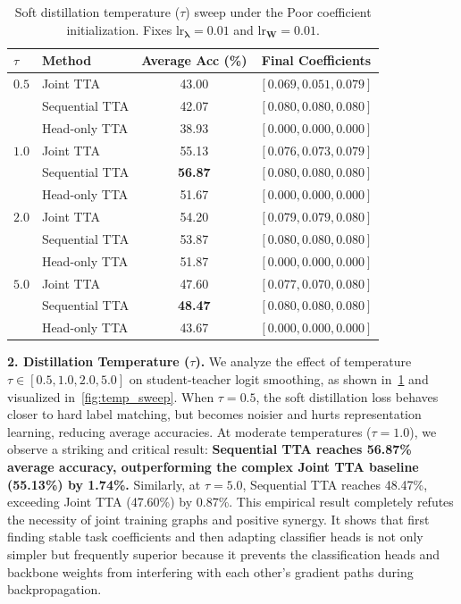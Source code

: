 \documentclass{article}
\theoremstyle{plain}
\theoremstyle{definition}
\theoremstyle{remark}
\begin{document}
\begin{table}[t]
\caption{Soft distillation temperature ($\tau$) sweep under the Poor coefficient initialization. Fixes $\text{lr}_{\boldsymbol{\lambda}} = 0.01$ and $\text{lr}_{\mathbf{W}} = 0.01$.}
\label{tab:temp_sweep}
\vskip 0.08in
\begin{center}
\begin{small}
\begin{sc}
\begin{tabular}{llcc}
\toprule
$\tau$ & Method & Average Acc (\%) & Final Coefficients \\
\midrule
$0.5$ & Joint TTA      & 43.00 & $[0.069, 0.051, 0.079]$ \\
      & Sequential TTA & 42.07 & $[0.080, 0.080, 0.080]$ \\
      & Head-only TTA  & 38.93 & $[0.000, 0.000, 0.000]$ \\
\midrule
$1.0$ & Joint TTA      & 55.13 & $[0.076, 0.073, 0.079]$ \\
      & Sequential TTA & \textbf{56.87} & $[0.080, 0.080, 0.080]$ \\
      & Head-only TTA  & 51.67 & $[0.000, 0.000, 0.000]$ \\
\midrule
$2.0$ & Joint TTA      & 54.20 & $[0.079, 0.079, 0.080]$ \\
      & Sequential TTA & 53.87 & $[0.080, 0.080, 0.080]$ \\
      & Head-only TTA  & 51.87 & $[0.000, 0.000, 0.000]$ \\
\midrule
$5.0$ & Joint TTA      & 47.60 & $[0.077, 0.070, 0.080]$ \\
      & Sequential TTA & \textbf{48.47} & $[0.080, 0.080, 0.080]$ \\
      & Head-only TTA  & 43.67 & $[0.000, 0.000, 0.000]$ \\
\bottomrule
\end{tabular}
\end{sc}
\end{small}
\end{center}
\vskip -0.1in
\end{table}

\textbf{2. Distillation Temperature ($\tau$).} We analyze the effect of temperature $\tau \in [0.5, 1.0, 2.0, 5.0]$ on student-teacher logit smoothing, as shown in~\cref{tab:temp_sweep} and visualized in~\cref{fig:temp_sweep}. 
When $\tau = 0.5$, the soft distillation loss behaves closer to hard label matching, but becomes noisier and hurts representation learning, reducing average accuracies. 
At moderate temperatures ($\tau = 1.0$), we observe a striking and critical result: \textbf{Sequential TTA reaches 56.87\% average accuracy, outperforming the complex Joint TTA baseline (55.13\%) by 1.74\%.} Similarly, at $\tau = 5.0$, Sequential TTA reaches 48.47\%, exceeding Joint TTA (47.60\%) by 0.87\%. 
This empirical result completely refutes the necessity of joint training graphs and positive synergy. It shows that first finding stable task coefficients and then adapting classifier heads is not only simpler but frequently superior because it prevents the classification heads and backbone weights from interfering with each other's gradient paths during backpropagation.
\end{document}
